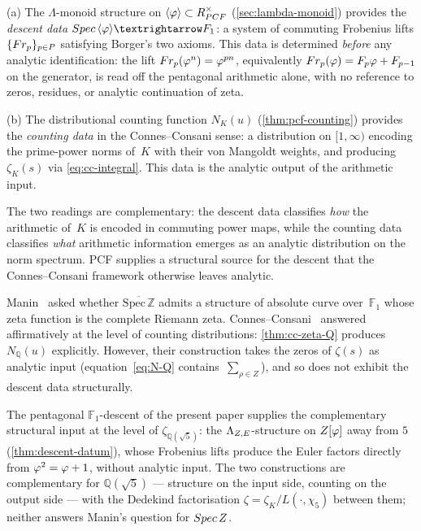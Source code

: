 \begin{remark}\label{rmk:two-readings}
\textup{(a)} The $\Lambda$-monoid structure on
$\langle\varphi\rangle\subset R_{PCF}^\times$
\textup{(\cref{sec:lambda-monoid})} provides the
\emph{descent data} $\mathrm{Spec}\,\langle\golden\rangle\to\mathbb{F}_1$:
a system of commuting Frobenius lifts $\{Fr_p\}_{p\in P}$
satisfying Borger's two axioms.
This data is determined
\emph{before} any analytic identification: the lift
$Fr_p(\varphi^n) = \varphi^{pn}$, equivalently
$Fr_p(\varphi) = F_p\varphi + F_{p-1}$ on the generator, is read
off the pentagonal arithmetic alone, with no reference to zeros,
residues, or analytic continuation of zeta.

\textup{(b)} The distributional counting function $N_K(u)$
\textup{(\cref{thm:pcf-counting})} provides the
\emph{counting data} in the Connes--Consani sense: a distribution
on $[1,\infty)$ encoding the prime-power norms of~$K$ with
their von Mangoldt weights, and producing $\zeta_K(s)$ via
\eqref{eq:cc-integral}.  This data is the analytic output of the
arithmetic input.

The two readings are complementary: the descent data classifies
\emph{how} the arithmetic of~$K$ is encoded in commuting power
maps, while the counting data classifies \emph{what} arithmetic
information emerges as an analytic distribution on the norm
spectrum.  PCF supplies a structural source for the descent that
the Connes--Consani framework otherwise leaves analytic.
\end{remark}

\begin{remark}\label{rmk:manin-question}
Manin~\cite{manin95} asked whether
$\overline{\mathrm{Spec}\,\mathbb{Z}}$ admits a structure of
absolute curve over~$\mathbb{F}_1$ whose zeta function is the
complete Riemann zeta.  Connes--Consani~\cite{connesconsani10}
answered affirmatively at the level of counting distributions:
\cref{thm:cc-zeta-Q} produces $N_\mathbb{Q}(u)$
explicitly.  However, their construction takes the zeros of
$\zeta(s)$ as analytic input
\textup{(}equation~\eqref{eq:N-Q} contains~$\sum_{\rho\in Z}$\textup{)},
and so does not exhibit the descent data structurally.

The pentagonal $\mathbb{F}_1$-descent of the present paper supplies
the complementary structural input at the level of
$\zeta_{\mathbb{Q}(\sqrt{5})}$: the $\Lambda_{Z,E}$-structure on $Z[\varphi]$ away from $5$
(\cref{thm:descent-datum}), whose Frobenius lifts produce the Euler factors directly from
$\varphi^2 = \varphi + 1$, without analytic input.  The two
constructions are complementary for $\mathbb{Q}(\sqrt{5})$ --- structure on the input
side, counting on the output side --- with the Dedekind factorisation
$\zeta = \zeta_K/L(\cdot,\chi_5)$ between them; neither answers Manin's question for
$Spec\,Z$.
\end{remark}

